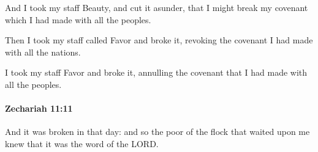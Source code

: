 			\begin{versebox}
					\item[BHS] 
					\item[LXX] 
					\item[ASV] And I took my staff Beauty, and cut it asunder, that I might break my covenant which I had made with all the peoples.
					\item[NIV] Then I took my staff called Favor and broke it, revoking the covenant I had made with all the nations.
					\item[NRSV] I took my staff Favor and broke it, annulling the covenant that I had made with all the peoples.
			\end{versebox}

		\paragraph{Zechariah 11:11} %
			\label{ZECHARIAH-11-11}

			And it was broken in that day: and so the poor of the flock that waited upon me knew that it was the word of the LORD.

